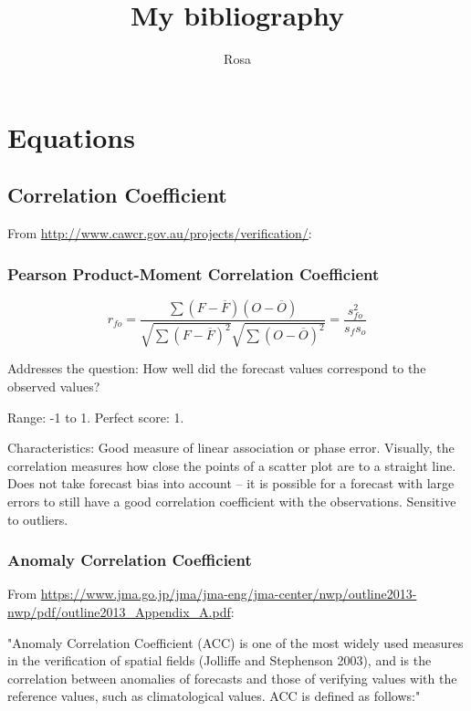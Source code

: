\documentclass[12pt,a4paper]{article}
\title{My bibliography}
\author{Rosa}
\begin{document}
\maketitle
\tableofcontents

\section{Equations}

\subsection{Correlation Coefficient}

From \url{http://www.cawcr.gov.au/projects/verification/}:

\subsubsection{Pearson Product-Moment Correlation Coefficient}

\begin{equation}
r_{fo} = \frac{\sum {(F-\overline{F})(O-\overline{O})}}{\sqrt{\sum{(F-\overline{F})^2}} \sqrt{\sum{(O - \overline{O})^2}}} = \frac{s^2_{fo}}{s_f s_o}
\end{equation}

Addresses the question: How well did the forecast values correspond to the observed values?

Range: -1 to 1.  Perfect score: 1.

Characteristics: Good measure of linear association or phase error. Visually, the correlation measures how close the points of a scatter plot are to a straight line. Does not take forecast bias into account -- it is possible for a forecast with large errors to still have a good correlation coefficient with the observations. Sensitive to outliers.

\subsubsection{Anomaly Correlation Coefficient}
From \url{https://www.jma.go.jp/jma/jma-eng/jma-center/nwp/outline2013-nwp/pdf/outline2013_Appendix_A.pdf}:

"Anomaly Correlation Coefficient (ACC) is one of the most widely used measures in the verification of spatial fields (Jolliffe and Stephenson 2003), and is the correlation between anomalies of forecasts and those of verifying values with the reference values, such as climatological values. ACC is defined as follows:"
\end{document}
